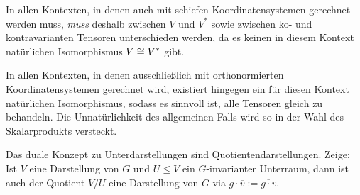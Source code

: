 \begin{sheet}
\begin{remark}
In allen Kontexten, in denen auch mit schiefen Koordinatensystemen gerechnet werden muss, \emph{muss} deshalb zwischen $V$ und $V^\ast$ sowie zwischen ko- und kontravarianten Tensoren unterschieden werden, da es keinen in diesem Kontext natürlichen Isomorphismus $V\cong V^\ast$ gibt.

In allen Kontexten, in denen ausschließlich mit orthonormierten Koordinatensystemen gerechnet wird, existiert hingegen ein für diesen Kontext natürlichen Isomorphismus, sodass es sinnvoll ist, alle Tensoren gleich zu behandeln. Die Unnatürlichkeit des allgemeinen Falls wird so in der Wahl des Skalarprodukts versteckt.
\end{remark}

\begin{problem}[title={Quotienten}]
Das duale Konzept zu Unterdarstellungen sind Quotientendarstellungen. Zeige: Ist $V$ eine Darstellung von $G$ und $U\leq V$ ein $G$-invarianter Unterraum, dann ist auch der Quotient $V/U$ eine Darstellung von $G$ via $g\cdot\overline{v} := \overline{g\cdot v}$.
\end{problem}
	
\end{sheet}